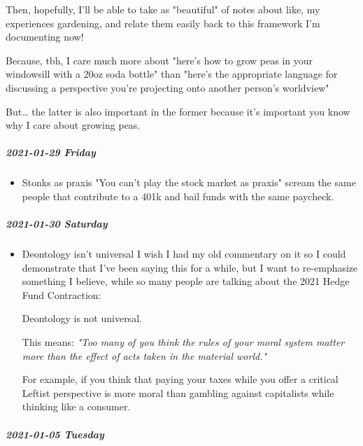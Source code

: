 \documentclass[11pt]{article}
\begin{document}
\begin{itemize}
Then, hopefully, I'll be able to take as "beautiful" of notes about like, my experiences gardening, and relate them easily back to this framework I'm documenting now!

Because, tbh, I care much more about "here's how to grow peas in your windowsill with a 20oz soda bottle" than "here's the appropriate language for discussing a perspective you're projecting onto another person's worldview"

But… the latter is also important in the former because it's important you know why I care about growing peas.
\end{itemize}
\subparagraph*{2021-01-29 Friday}
\label{sec:org7f41c3c}
\begin{itemize}
\item Stonks as praxis
\label{sec:org5529336}
"You can't play the stock market as praxis" scream the same people that contribute to a 401k and bail funds with the same paycheck.
\end{itemize}
\subparagraph*{2021-01-30 Saturday}
\label{sec:orge4fd270}
\begin{itemize}
\item Deontology isn't universal
\label{sec:org70f8f5c}
I wish I had my old commentary on it so I could demonstrate that I've been saying this for a while, but I want to re-emphasize something I believe, while so many people are talking about the 2021 Hedge Fund Contraction:

Deontology is not universal.

This means: \emph{"Too many of you think the rules of your moral system matter more than the effect of acts taken in the material world."}

For example, if you think that paying your taxes while you offer a critical Leftist perspective is more moral than gambling against capitalists while thinking like a consumer.
\end{itemize}
\subparagraph*{2021-01-05 Tuesday}
\label{sec:org157b93b}
\end{document}
